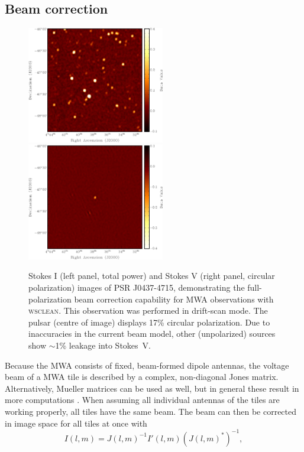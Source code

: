 \documentclass[useAMS,usenatbib]{mn2e}
\begin{document}
\subsection{Beam correction}
\begin{figure}
\begin{center}
\includegraphics[width=6cm]{img/pulsar-stokesi}\hspace{1cm}\includegraphics[width=6cm]{img/pulsar-stokesv}
\caption{Stokes I (left panel, total power) and Stokes V (right panel, circular polarization) images of PSR J0437-4715, demonstrating the full-polarization beam correction capability for MWA observations with \textsc{wsclean}. This observation was performed in drift-scan mode. The pulsar (centre of image) displays 17\% circular polarization. Due to inaccuracies in the current beam model, other (unpolarized) sources show $\sim$1\% leakage into Stokes~V.}
\label{fig:pulsar-stokes-iv}
\end{center}
\end{figure}
Because the MWA consists of fixed, beam-formed dipole antennas, the voltage beam of a MWA tile is described by a complex, non-diagonal Jones matrix. Alternatively, Mueller matrices can be used as well, but in general these result in more computations \citep{revisiting-me-i}. When assuming all individual antennas of the tiles are working properly, all tiles have the same beam. The beam can then be corrected in image space for all tiles at once with
\begin{equation}\label{eq:beam-correction}
 I(l, m) = J(l,m)^{-1} I'(l, m) \left(J(l,m)^*\right)^{-1},
\end{equation}
\end{document}
